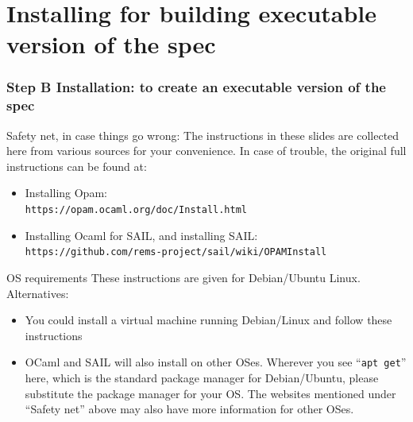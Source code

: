 \documentclass[aspectratio=169]{beamer}
\newcommand{\hm}{\hspace*{1em}}
\newcommand{\scripttt}{\scriptsize\tt}
\begin{document}

\section{Installing for building executable version of the spec}

\begin{frame}
  \frametitle{Step B Installation: to create an executable version of the spec}

  \begin{block}{Safety net, in case things go wrong:}
    \scriptsize
    The instructions in these slides are collected here from various
    sources for your convenience. In case of trouble, the original
    full instructions can be found at:

    \begin{itemize}

      \item Installing Opam: \\
        {\scripttt\hm https://opam.ocaml.org/doc/Install.html}

      \item Installing Ocaml for SAIL, and installing SAIL: \\
        {\scripttt\hm https://github.com/rems-project/sail/wiki/OPAMInstall}

    \end{itemize}
  \end{block}

  \begin{block}{OS requirements}
    \scriptsize
    These instructions are given for Debian/Ubuntu Linux.  Alternatives:
    \begin{itemize}
      \item You could install a virtual machine running Debian/Linux and follow these instructions


      \item OCaml and SAIL will also install on other OSes. Wherever
        you see ``{\tt apt get}'' here, which is the standard package
        manager for Debian/Ubuntu, please substitute the package
        manager for your OS.  The websites mentioned under ``Safety
        net'' above may also have more information for other OSes.

    \end{itemize}
  \end{block}

\end{frame}
\end{document}
